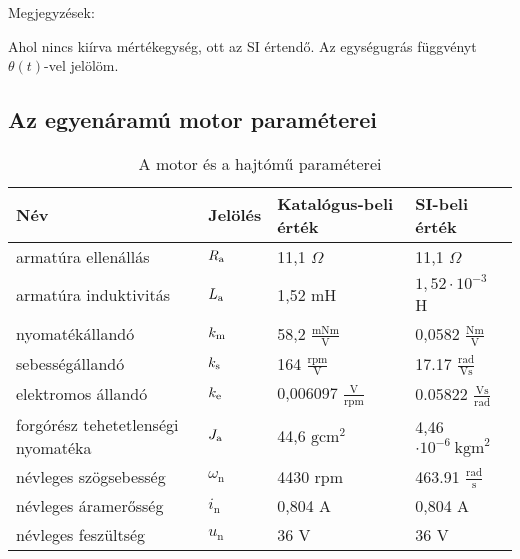 \clearpage

Megjegyzések:
\begin{outline}
  \1 Ahol nincs kiírva mértékegység, ott az SI értendő.
  \1 Az egységugrás függvényt $\theta(t)$-vel jelölöm.
\end{outline}

\subsection*{Az egyenáramú motor paraméterei}

\begin{table}[H]
\begin{tabular}{llll}\toprule
Név                                & Jelölés           & Katalógus-beli érték                    & SI-beli érték                           \\ \midrule
armatúra ellenállás                & $R_\text{a}$             & 11,1 $\Omega$                           & 11,1 $\Omega$                           \\
armatúra induktivitás              & $L_\text{a}$             & 1,52 mH                                 & $1,52\cdot10^{-3}$ H                    \\
nyomatékállandó                    & $k_\text{m}$             & 58,2 $\frac{\text{mNm}}{\text{V}}$      & 0,0582 $\frac{\text{Nm}}{\text{V}}$     \\
sebességállandó                    & $k_\text{s}$             & 164 $\frac{\text{rpm}}{\text{V}}$       & 17.17 $\frac{\text{rad}}{\text{Vs}}$    \\
elektromos állandó                 & $k_\text{e}$             & 0,006097  $\frac{\text{V}}{\text{rpm}}$ & 0.05822 $\frac{\text{Vs}}{\text{rad}}$  \\
forgórész tehetetlenségi nyomatéka & $J_\text{a}$             & 44,6 $\text{gcm}^2$                     & 4,46$\cdot10^{-6}~\text{kgm}^2$         \\
névleges szögsebesség              & $\omega_\text{n}$ & 4430 rpm                                & 463.91 $\frac{\text{rad}}{\text{s}}$    \\
névleges áramerősség               & $i_\text{n}$      & 0,804 A                                 & 0,804 A                                 \\
névleges feszültség                & $u_\text{n}$      & 36 V                                    & 36 V                                    \\ \bottomrule
\end{tabular}
\caption{A motor és a hajtómű paraméterei}
\end{table}
